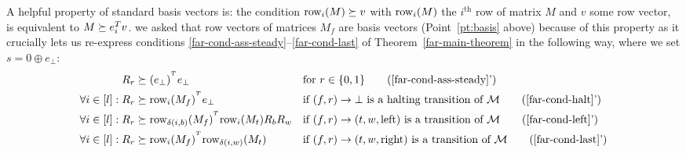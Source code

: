 {  A helpful property of standard basis vectors is: the condition $\text{row}_i(M) \succeq v$ with $\text{row}_i(M)$ the $i^\text{th}$ row of matrix $M$ and $v$ some row vector, is equivalent to $M\succeq e_i^T v$. we asked that row vectors of matrices $M_f$ are basis vectors (Point~\ref{pt:basis} above) because of this property as it crucially lets us re-express conditions \eqref{far-cond-ass-steady}--\eqref{far-cond-last} of Theorem~\ref{far-main-theorem} in the following way, where we set $s=0\oplus e_\bot$:
  \begin{align}
    R_r                  & \succeq (e_\bot)^{\T}e_\bot
                         &                                                  & \text{for }r\in\{0,1\}
    \tag{\ref{far-cond-ass-steady}'}
    \\
    \forall i\in[l]: R_r & \succeq \row_i(M_f)^{\T}e_\bot
                         &                                                  & \text{if $(f,r) \to \bot$ is a halting transition of $\mathcal{M}$}
    \tag{\ref{far-cond-halt}'}
    \\
    \forall i\in[l]: R_r & \succeq
    \row_{\delta(i,b)}(M_f)^{\T} \row_i(M_t)R_b R_w
                         &                                                  & \text{if $(f,r) \to (t,w,\text{left})$ is a transition of $\mathcal{M}$}
    \tag{\ref{far-cond-left}'}
    \\
    \forall i\in[l]: R_r & \succeq \row_i(M_f)^{\T} \row_{\delta(i,w)}(M_t)
                         &                                                  & \text{if $(f,r) \to (t,w,\text{right})$ is a transition of $\mathcal{M}$}
    \tag{\ref{far-cond-last}'}
  \end{align}


}



